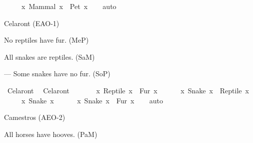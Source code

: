 \begin{isabellebody}
\begin{exercise}[subtitle=Silogizmi]
\ \ \ \ {\isacharparenleft}{\kern0pt}{\isasymexists}\ x{\isachardot}{\kern0pt}\ Mammal\ x\ {\isasymand}\ {\isasymnot}Pet\ x{\isacharparenright}{\kern0pt}{\isachardoublequoteclose}\isanewline
%
\isadelimproof
\ \ %
\endisadelimproof
%
\isatagproof
{}\isamarkupfalse%
\ auto%
\endisatagproof
{\isafoldproof}%
%
\isadelimproof
%
\endisadelimproof
%
\begin{isamarkuptext}%
Celaront (EAO-1)%
\end{isamarkuptext}\isamarkuptrue%
%
\begin{isamarkuptext}%
No reptiles have fur. (MeP)%
\end{isamarkuptext}\isamarkuptrue%
%
\begin{isamarkuptext}%
All snakes are reptiles. (SaM)%
\end{isamarkuptext}\isamarkuptrue%
%
\begin{isamarkuptext}%
— Some snakes have no fur. (SoP)%
\end{isamarkuptext}\isamarkuptrue%
\isamarkupfalse%
\ Celaront{\isacharcolon}{\kern0pt}\ %
\isadelimproof
%
\endisadelimproof
%
\isatagproof
%
\endisatagproof
{\isafoldproof}%
%
\isadelimproof
\isanewline
%
\endisadelimproof
{}\isamarkupfalse%
\ Celaront{\isacharcolon}{\kern0pt}\ {\isachardoublequoteopen}\isanewline
\ \ \ \ {\isacharparenleft}{\kern0pt}{\isasymnot}\ {\isacharparenleft}{\kern0pt}{\isasymexists}\ x{\isachardot}{\kern0pt}\ Reptile\ x\ {\isasymand}\ Fur\ x{\isacharparenright}{\kern0pt}{\isacharparenright}{\kern0pt}\ {\isasymand}\isanewline
\ \ \ \ {\isacharparenleft}{\kern0pt}{\isasymforall}\ x{\isachardot}{\kern0pt}\ Snake\ x\ {\isasymlongrightarrow}\ Reptile\ x{\isacharparenright}{\kern0pt}\ {\isasymand}\isanewline
\ \ \ \ {\isacharparenleft}{\kern0pt}{\isasymexists}\ x{\isachardot}{\kern0pt}\ Snake\ x{\isacharparenright}{\kern0pt}\ {\isasymlongrightarrow}\isanewline
\ \ \ \ {\isacharparenleft}{\kern0pt}{\isasymexists}\ x{\isachardot}{\kern0pt}\ Snake\ x\ {\isasymand}\ {\isasymnot}Fur\ x{\isacharparenright}{\kern0pt}{\isachardoublequoteclose}\isanewline
%
\isadelimproof
\ \ %
\endisadelimproof
%
\isatagproof
{}\isamarkupfalse%
\ auto%
\endisatagproof
{\isafoldproof}%
%
\isadelimproof
%
\endisadelimproof
%
\begin{isamarkuptext}%
Camestros (AEO-2)%
\end{isamarkuptext}\isamarkuptrue%
%
\begin{isamarkuptext}%
All horses have hooves. (PaM)%
\end{isamarkuptext}\isamarkuptrue%

\end{exercise}
\end{isabellebody}
